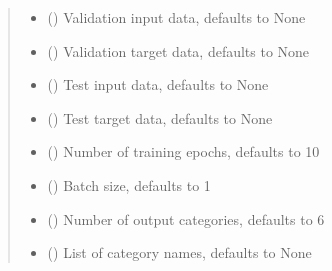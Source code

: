 \documentclass[letterpaper,10pt,english]{sphinxmanual}
\begin{document}
\begin{fulllineitems}
\begin{quote}
\begin{description}
\begin{itemize}
\item {} 
\sphinxAtStartPar
{} (\sphinxstyleliteralemphasis{\sphinxupquote{, }}) \textendash{} Validation input data, defaults to None

\item {} 
\sphinxAtStartPar
{} (\sphinxstyleliteralemphasis{\sphinxupquote{, }}) \textendash{} Validation target data, defaults to None

\item {} 
\sphinxAtStartPar
{} (\sphinxstyleliteralemphasis{\sphinxupquote{, }}) \textendash{} Test input data, defaults to None

\item {} 
\sphinxAtStartPar
{} (\sphinxstyleliteralemphasis{\sphinxupquote{, }}) \textendash{} Test target data, defaults to None

\item {} 
\sphinxAtStartPar
{} (\sphinxstyleliteralemphasis{\sphinxupquote{, }}) \textendash{} Number of training epochs, defaults to 10

\item {} 
\sphinxAtStartPar
{} (\sphinxstyleliteralemphasis{\sphinxupquote{, }}) \textendash{} Batch size, defaults to 1

\item {} 
\sphinxAtStartPar
{} (\sphinxstyleliteralemphasis{\sphinxupquote{, }}) \textendash{} Number of output categories, defaults to 6

\item {} 
\sphinxAtStartPar
{} (\sphinxstyleliteralemphasis{\sphinxupquote{{[}}}\sphinxstyleliteralemphasis{\sphinxupquote{{]}}}\sphinxstyleliteralemphasis{\sphinxupquote{, }}) \textendash{} List of category names, defaults to None


\end{itemize}
\end{description}
\end{quote}
\end{fulllineitems}
\end{document}

